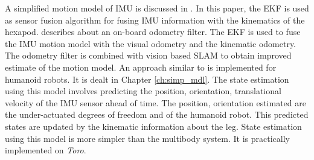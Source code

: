     A simplified motion model of IMU is discussed in \cite{bloe12}. In this paper, the EKF is used as sensor fusion algorithm for fusing IMU information with the kinematics of the hexapod. \citep{vis12} describes about an on-board odometry filter. The EKF is used to fuse the IMU motion model with the visual odometry and the kinematic odometry. The odometry filter is combined with vision based SLAM to obtain improved estimate of the motion model. An approach similar to \cite{bloe12} is implemented for humanoid robots. It is dealt in Chapter \ref{ch:simp_mdl}. The state estimation using this model involves predicting the position, orientation, translational velocity of the IMU sensor ahead of time. The position, orientation estimated are the under-actuated degrees of freedom and of the humanoid robot. This predicted states are updated by the kinematic information about the leg. State estimation using this model is more simpler than the multibody system. It is practically implemented on \emph{Toro}.
